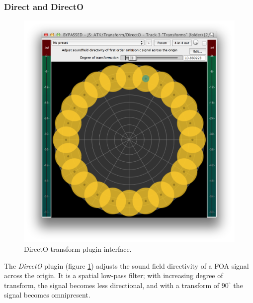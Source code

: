 \documentclass{article}
\begin{document}
\subsubsection{Direct and DirectO}\label{sec:direct}

\begin{figure}[h]
\captionsetup{aboveskip=-6pt}
\centering
\includegraphics[width=0.9\columnwidth]{figures/directOTransform.png}
\caption{DirectO transform plugin interface.\label{fig:directOTransform}}
\end{figure}

The \emph{DirectO} plugin (figure \ref{fig:directOTransform}) adjusts the sound field directivity of a FOA signal across the origin.
It is a spatial low-pass filter; with increasing degree of transform, the signal becomes less directional, and with a transform of $90^{\circ}$ the signal becomes omnipresent.
  
\end{document}
